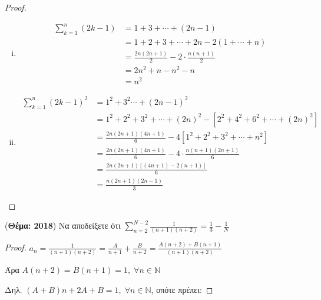 \begin{multicols}{2}
\begin{enumerate}
        \begin{proof}
        \item {}
            \begin{enumerate}[i)]
                \item \begin{align*}
                \sum_{k=1}^{n} (2k-1) &= 1 + 3 + \cdots + (2n-1) \\
                                      &=1 + 2 + 3 +\cdots +2n - 2(1+\cdots +n) \\
                                      &= \frac{2n(2n+1)}{2}-2 \cdot \frac{n(n+1)}{2} \\
                                      &=2n^{2}+n-n^{2}-n \\
                                      &=n^{2}
            \end{align*}

        \item \begin{align*}
                \sum_{k=1}^{n} (2k-1)^{2} 
                &=1^{2}+3^{2}\cdots + (2n-1)^{2} \\
                &=1^{2}+2^{2}+3^{2}+\cdots +(2n)^{2}-[2^{2}+4^{2}+6^{2}+\cdots +
                (2n)^{2}] \\
                &= \frac{2n(2n+1)(4n+1)}{6} - 4[1^{2}+2^{2}+3^{2}+\cdots +n^{2}] \\
                &= \frac{2n(2n+1)(4n+1)}{6} - 4 \cdot \frac{n(n+1)(2n+1)}{6} \\
                &= \frac{2n(2n+1)[(4n+1)-2(n+1)]}{6} \\
                &= \frac{n(2n+1)(2n-1)}{3} 
        \end{align*}
            \end{enumerate}
        \end{proof}

    \item \label{ask:thema18sum} ({\bfseries Θέμα: 2018}) 
        Να αποδείξετε ότι $ \sum_{n=2}^{N-2} \frac{1}{(n+1)(n+2)} = \frac{1}{3} 
        - \frac{1}{N} $

        \begin{proof}
        \item {}
            $ a_n = \frac{1}{(n+1)(n+2)} = \frac{A}{n+1} + \frac{B}{n+2} = 
            \frac{A(n+2)+B(n+1)}{(n+1)(n+2)} $

            Άρα $A(n+2) = B(n+1) = 1, \; \forall n \in \mathbb{N}$

            Δηλ. $ (A+B)n+2A+B=1, \; \forall n \in \mathbb{N} $, οπότε πρέπει:


\end{proof}
\end{enumerate}
\end{multicols}
